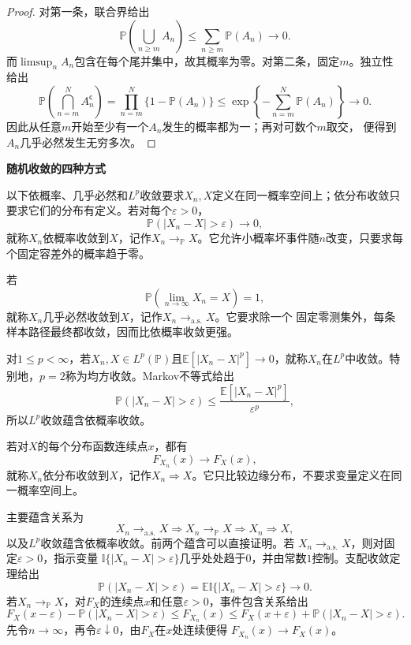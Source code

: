 \begin{proof}
对第一条，联合界给出
\[
  \mathbb{P}\left(\bigcup_{n\geq m}A_n\right)
  \leq\sum_{n\geq m}\mathbb{P}(A_n)\longrightarrow0.
\]
而\(\limsup_n A_n\)包含在每个尾并集中，故其概率为零。对第二条，固定\(m\)。独立性
给出
\[
  \mathbb{P}\left(\bigcap_{n=m}^{N}A_n^{\mathsf c}\right)
  =
  \prod_{n=m}^{N}\{1-\mathbb{P}(A_n)\}
  \leq
  \exp\left\{-\sum_{n=m}^{N}\mathbb{P}(A_n)\right\}
  \longrightarrow0.
\]
因此从任意\(m\)开始至少有一个\(A_n\)发生的概率都为一；再对可数个\(m\)取交，
便得到\(A_n\)几乎必然发生无穷多次。
\end{proof}

\par\medskip\noindent\textbf{随机收敛的四种方式}\quad
\begin{definition}[随机变量的收敛]
  \label{def:probability-random-convergence}
以下依概率、几乎必然和\(L^p\)收敛要求\(X_n,X\)定义在同一概率空间上；依分布收敛只要求它们的分布有定义。若对每个\(\varepsilon>0\)，
\[ \mathbb{P}(|X_n-X|>\varepsilon)\to0, \]
就称\(X_n\)依概率收敛到\(X\)，记作\(X_n\to_{\mathbb{P}}X\)。它允许小概率坏事件随\(n\)改变，只要求每个固定容差外的概率趋于零。

若
\[ \mathbb{P}\left(
    \lim_{n\to\infty}X_n=X\right)=1, \]
就称\(X_n\)几乎必然收敛到\(X\)，记作\(X_n\to_{\mathrm{a.s.}}X\)。它要求除一个
固定零测集外，每条样本路径最终都收敛，因而比依概率收敛更强。

对\(1\leq p<\infty\)，若\(X_n,X\in L^p(\mathbb P)\)且\(\mathbb{E}[|X_n-X|^p]\to0\)，就称\(X_n\)在\(L^p\)中收敛。特别地，\(p=2\)称为均方收敛。Markov不等式给出
\[ \mathbb{P}(|X_n-X|>\varepsilon)
  \leq\frac{\mathbb{E}[|X_n-X|^p]}{\varepsilon^p}, \]
所以\(L^p\)收敛蕴含依概率收敛。

若对\(X\)的每个分布函数连续点\(x\)，都有
\[ F_{X_n}(x)\to F_X(x), \]
就称\(X_n\)依分布收敛到\(X\)，记作\(X_n\Rightarrow X\)。它只比较边缘分布，不要求变量定义在同一概率空间上。

\end{definition}
主要蕴含关系为
\[ X_n\to_{\mathrm{a.s.}}X
  \Longrightarrow X_n\to_{\mathbb{P}}X\Longrightarrow X_n\Rightarrow X, \]
以及\(L^p\)收敛蕴含依概率收敛。前两个蕴含可以直接证明。若
\(X_n\to_{\mathrm{a.s.}}X\)，则对固定\(\varepsilon>0\)，指示变量
\(\mathbb{I}\{|X_n-X|>\varepsilon\}\)几乎处处趋于\(0\)，并由常数\(1\)控制。支配收敛定理给出
\[
  \mathbb{P}(|X_n-X|>\varepsilon)
  =\mathbb{E}\mathbb{I}\{|X_n-X|>\varepsilon\}\to0.
\]
若\(X_n\to_{\mathbb{P}}X\)，对\(F_X\)的连续点\(x\)和任意\(\varepsilon>0\)，事件包含关系给出
\[
  F_X(x-\varepsilon)-\mathbb{P}(|X_n-X|>\varepsilon)
  \leq F_{X_n}(x)
  \leq
  F_X(x+\varepsilon)+\mathbb{P}(|X_n-X|>\varepsilon).
\]
先令\(n\to\infty\)，再令\(\varepsilon\downarrow0\)，由\(F_X\)在\(x\)处连续便得
\(F_{X_n}(x)\to F_X(x)\)。

